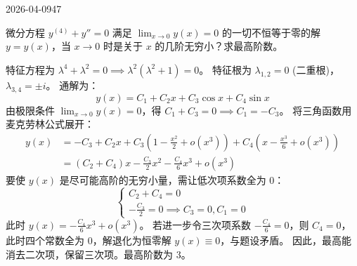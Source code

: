 \begin{mistake}{2026-04-09}{47}

\begin{problemcontent}
微分方程 \( y^{(4)} + y'' = 0 \) 满足 \(\displaystyle \lim_{x \to 0} y(x) = 0 \) 的一切不恒等于零的解 \( y = y(x) \)，当 \( x \to 0 \) 时是关于 \( x \) 的几阶无穷小？求最高阶数。
\end{problemcontent}

\begin{solutioncontent}
特征方程为 \( \lambda^4 + \lambda^2 = 0 \implies \lambda^2(\lambda^2 + 1) = 0 \)。
特征根为 \( \lambda_{1,2} = 0 \) (二重根)，\( \lambda_{3,4} = \pm i \)。
通解为：
\[ y(x) = C_1 + C_2 x + C_3 \cos x + C_4 \sin x \]
由极限条件 \(\lim_{x \to 0} y(x) = 0\)，得 \( C_1 + C_3 = 0 \implies C_1 = -C_3 \)。
将三角函数用麦克劳林公式展开：
\[
\begin{aligned}
y(x) &= -C_3 + C_2 x + C_3\left(1 - \frac{x^2}{2} + o(x^3)\right) + C_4\left(x - \frac{x^3}{6} + o(x^3)\right) \\
&= (C_2 + C_4)x - \frac{C_3}{2}x^2 - \frac{C_4}{6}x^3 + o(x^3)
\end{aligned}
\]
要使 \( y(x) \) 是尽可能高阶的无穷小量，需让低次项系数全为 0：
\[
\begin{cases}
C_2 + C_4 = 0 \\
-\frac{C_3}{2} = 0 \implies C_3 = 0, C_1 = 0
\end{cases}
\]
此时 \( y(x) = -\frac{C_4}{6}x^3 + o(x^3) \)。
若进一步令三次项系数 \(-\frac{C_4}{6} = 0\)，则 \( C_4 = 0 \)，此时四个常数全为 0，解退化为恒零解 \( y(x) \equiv 0 \)，与题设矛盾。
因此，最高能消去二次项，保留三次项。最高阶数为 3。
\end{solutioncontent}


\end{mistake}
